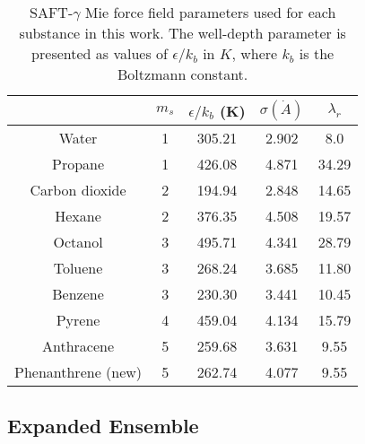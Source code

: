 \documentclass[preprint]{elsarticle}
\begin{document}
	\begin{table}
		\centering
		\caption{SAFT-$\gamma$ Mie force field parameters used for each substance in this work. The well-depth parameter is presented as values of $\epsilon/k_b$ in $K$, where $k_b$ is the Boltzmann constant.}
		\label{tbl:parameters}
		\begin{tabular}{ccccc}
			\hline\hline
			& $m_s$ & $\epsilon/k_{b}$ (K) & $\sigma (\dot{A})$ & $\lambda_r$ \\ \hline
			Water \cite{lobanova2016}        & 1     & 305.21               & 2.902              & 8.0         \\
			Propane \cite{herdes2015}        & 1     & 426.08               & 4.871              & 34.29       \\
			Carbon dioxide \cite{herdes2015} & 2     & 194.94               & 2.848              & 14.65       \\
			Hexane \cite{herdes2015}         & 2     & 376.35               & 4.508              & 19.57       \\
			Octanol \cite{ervik2016}         & 3     & 495.71               & 4.341              & 28.79       \\
			Toluene \cite{muller2017}        & 3     & 268.24               & 3.685              & 11.80       \\
			Benzene \cite{muller2017}        & 3     & 230.30               & 3.441              & 10.45       \\
			Pyrene \cite{muller2017}         & 4     & 459.04               & 4.134              & 15.79       \\
			Anthracene \cite{muller2017}     & 5     & 259.68               & 3.631              & 9.55        \\
			Phenanthrene (new)               & 5     & 262.74               & 4.077              & 9.55        \\ \hline\hline
		\end{tabular}
		
	\end{table}
	
	\subsection{Expanded Ensemble}
	\label{sec:expanded ensemble}
	
\end{document}
